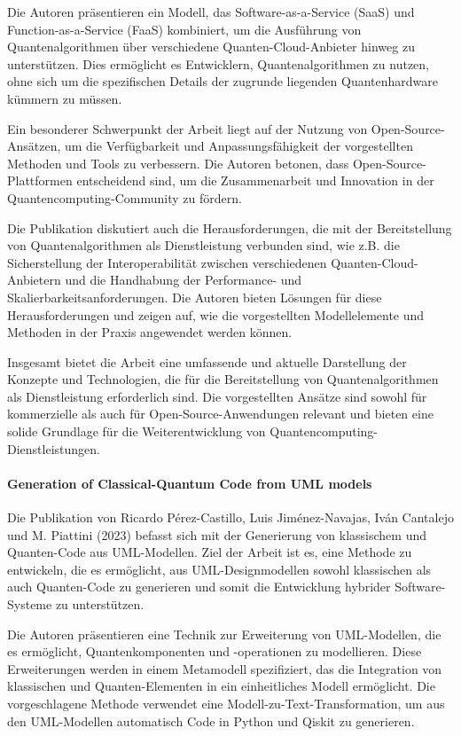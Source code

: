 Die Autoren präsentieren ein Modell, das Software-as-a-Service (SaaS) und Function-as-a-Service (FaaS) kombiniert, um 
die Ausführung von Quantenalgorithmen über verschiedene Quanten-Cloud-Anbieter hinweg zu unterstützen. Dies ermöglicht es 
Entwicklern, Quantenalgorithmen zu nutzen, ohne sich um die spezifischen Details der zugrunde liegenden Quantenhardware kümmern zu müssen. 

Ein besonderer Schwerpunkt der Arbeit liegt auf der Nutzung von Open-Source-Ansätzen, um die Verfügbarkeit und 
Anpassungsfähigkeit der vorgestellten Methoden und Tools zu verbessern. Die Autoren betonen, dass Open-Source-Plattformen 
entscheidend sind, um die Zusammenarbeit und Innovation in der Quantencomputing-Community zu fördern.

Die Publikation diskutiert auch die Herausforderungen, die mit der Bereitstellung von Quantenalgorithmen als 
Dienstleistung verbunden sind, wie z.B. die Sicherstellung der Interoperabilität zwischen verschiedenen Quanten-Cloud-Anbietern 
und die Handhabung der Performance- und Skalierbarkeitsanforderungen. Die Autoren bieten Lösungen für diese Herausforderungen 
und zeigen auf, wie die vorgestellten Modellelemente und Methoden in der Praxis angewendet werden können.

Insgesamt bietet die Arbeit eine umfassende und aktuelle Darstellung der Konzepte und Technologien, die für die 
Bereitstellung von Quantenalgorithmen als Dienstleistung erforderlich sind. Die vorgestellten Ansätze sind sowohl 
für kommerzielle als auch für Open-Source-Anwendungen relevant und bieten eine solide Grundlage für die Weiterentwicklung 
von Quantencomputing-Dienstleistungen.

\paragraph{Generation of Classical-Quantum Code from UML models}

Die Publikation von Ricardo Pérez-Castillo, Luis Jiménez-Navajas, Iván Cantalejo und M. Piattini (2023) 
befasst sich mit der Generierung von klassischem und Quanten-Code aus UML-Modellen. Ziel der Arbeit ist es, 
eine Methode zu entwickeln, die es ermöglicht, aus UML-Designmodellen sowohl klassischen als auch Quanten-Code 
zu generieren und somit die Entwicklung hybrider Software-Systeme zu unterstützen.

Die Autoren präsentieren eine Technik zur Erweiterung von UML-Modellen, die es ermöglicht, Quantenkomponenten 
und -operationen zu modellieren. Diese Erweiterungen werden in einem Metamodell spezifiziert, das die Integration 
von klassischen und Quanten-Elementen in ein einheitliches Modell ermöglicht. Die vorgeschlagene Methode verwendet 
eine Modell-zu-Text-Transformation, um aus den UML-Modellen automatisch Code in Python und Qiskit zu generieren.

